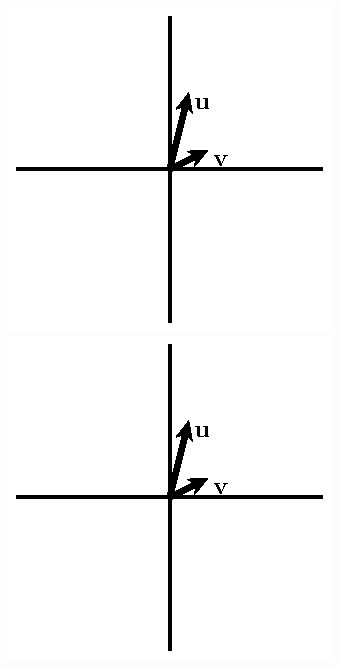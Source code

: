 \begin{activity} \label{A:9.2.5}

\begin{figure}[h]
  \begin{center}
    \begin{minipage}{3in}
      \begin{center}
        \includegraphics{figures/fig-9-19-activity.eps}
      \end{center}
      \caption{} %
      \label{F:9.2.vector_activity1}
    \end{minipage}
    \begin{minipage}{3in}
      \begin{center}
        \includegraphics{figures/fig-9-19-activity.eps}
      \end{center}
      \caption{} %
      \label{F:9.2.vector_activity2}
    \end{minipage}
  \end{center}
\end{figure}


\end{activity}

